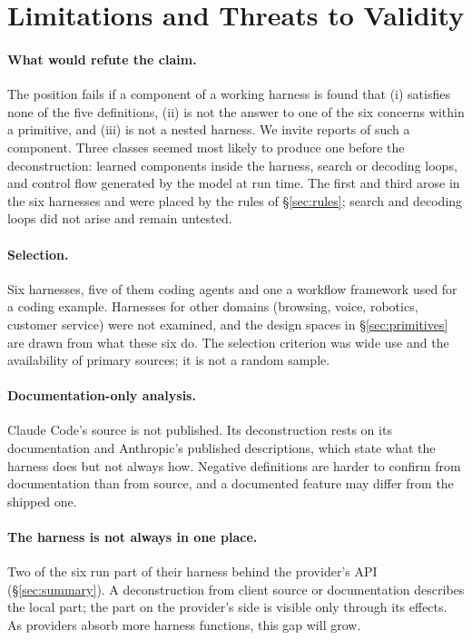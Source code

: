 \section{Limitations and Threats to Validity}
\label{sec:limitations}

\paragraph{What would refute the claim.} The position fails if a component of a working harness is found that (i) satisfies none of the five definitions, (ii) is not the answer to one of the six concerns within a primitive, and (iii) is not a nested harness. We invite reports of such a component. Three classes seemed most likely to produce one before the deconstruction: learned components inside the harness, search or decoding loops, and control flow generated by the model at run time. The first and third arose in the six harnesses and were placed by the rules of \S\ref{sec:rules}; search and decoding loops did not arise and remain untested.

\paragraph{Selection.} Six harnesses, five of them coding agents and one a workflow framework used for a coding example. Harnesses for other domains (browsing, voice, robotics, customer service) were not examined, and the design spaces in \S\ref{sec:primitives} are drawn from what these six do. The selection criterion was wide use and the availability of primary sources; it is not a random sample.

\paragraph{Documentation-only analysis.} Claude Code's source is not published. Its deconstruction rests on its documentation and Anthropic's published descriptions, which state what the harness does but not always how. Negative definitions are harder to confirm from documentation than from source, and a documented feature may differ from the shipped one.

\paragraph{The harness is not always in one place.} Two of the six run part of their harness behind the provider's API (\S\ref{sec:summary}). A deconstruction from client source or documentation describes the local part; the part on the provider's side is visible only through its effects. As providers absorb more harness functions, this gap will grow.

